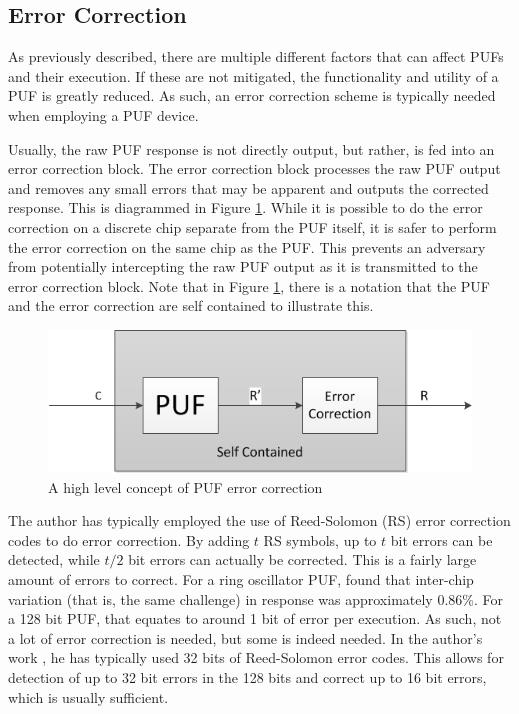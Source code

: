 
\subsection{Error Correction}
As previously described, there are multiple different factors that can affect PUFs
and their execution. If these are not mitigated, the functionality and utility of a PUF
is greatly reduced. As such, an error correction scheme is typically needed when employing
a PUF device.

Usually, the raw PUF response is not directly output, but rather, is fed into an
error correction block. The error correction block processes the raw PUF output and
removes any small errors that may be apparent and outputs the corrected response.
This is diagrammed in Figure \ref{fig:pufecc}. While it is possible to do the error
correction on a discrete chip separate from the PUF itself, it is safer to perform the
error correction on the same chip as the PUF. This prevents an adversary from potentially
intercepting the raw PUF output as it is transmitted to the error correction block. Note
that in Figure \ref{fig:pufecc}, there is a notation that the PUF and the error correction
are self contained to illustrate this.

\begin{figure}[h]
\includegraphics[]{images/puf_ecc.png}
\caption{A high level concept of PUF error correction}
\label{fig:pufecc}
\end{figure}

The author has typically employed the use of Reed-Solomon (RS) error correction codes to do 
error correction. By adding $t$ RS symbols, up to $t$ bit errors can be detected, 
while $t/2$ bit errors can actually be corrected. This is a fairly large amount of
errors to correct. For a ring oscillator PUF, \cite{pufhammingdistance} found that inter-chip
variation (that is, the same challenge) in response was approximately 0.86\%. For a 128 bit PUF,
that equates to around 1 bit of error per execution. As such, not a lot of error correction is needed,
but some is indeed needed. In the author's work \cite{PEAR} \cite{PUFROK} \cite{CODASPY}, he has typically 
used 32 bits of Reed-Solomon error codes. This allows for detection of up to 32 bit errors 
in the 128 bits and correct up to 16 bit errors, which is usually sufficient.


